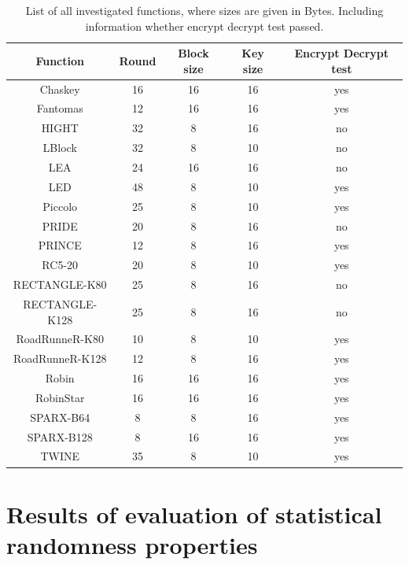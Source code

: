 \documentclass[
    digital,    %
    oneside,    %
    color,
    11pt,
    nocover,
    notable,
    nolof,
    nolot,
    final
]{fithesis3}
\begin{document}
\begin{table}[t]
	\centering
	\begin{tabular}{c|c c c c}
		\textbf{\large Function} & \textbf{\large Round} & \textbf{\large Block size} & \textbf{\large Key size} & \textbf{\large Encrypt Decrypt test}\\ \hline
		Chaskey			& 16	& 16	& 16	& yes 	\\ \hline
		Fantomas		& 12	& 16	& 16	& yes 	\\ \hline
		HIGHT			& 32	& 8		& 16	& no 	\\ \hline
		LBlock			& 32	& 8		& 10	& no \\ \hline
		LEA				& 24	& 16	& 16	& no \\ \hline
		LED 			& 48	& 8		& 10	& yes \\ \hline
		Piccolo			& 25	& 8		& 10	& yes \\ \hline
		PRIDE			& 20	& 8		& 16	& no  \\ \hline
		PRINCE			& 12	& 8		& 16	& yes \\ \hline
		RC5-20			& 20	& 8		& 10	& yes \\ \hline
		RECTANGLE-K80	& 25	& 8		& 16	& no \\ \hline
		RECTANGLE-K128	& 25	& 8		& 16	& no \\ \hline
		RoadRunneR-K80	& 10	& 8		& 10	& yes \\ \hline
		RoadRunneR-K128	& 12	& 8		& 16	& yes \\ \hline
		Robin			& 16	& 16	& 16	& yes \\ \hline
		RobinStar		& 16	& 16	& 16	& yes \\ \hline
		SPARX-B64		& 8		& 8		& 16	& yes \\ \hline
		SPARX-B128		& 8		& 16	& 16	& yes \\ \hline
		TWINE			& 35	& 8		& 10	& yes \\ \hline
		
		
	\end{tabular}
	\caption{List of all investigated functions, where sizes are given in Bytes. Including information whether encrypt decrypt test passed.}
	\label{table:list-of-investigated functions}
\end{table}



\chapter{Results of evaluation of statistical randomness properties}



\printbibliography[heading=bibintoc] %

\appendix{}
\end{document}
